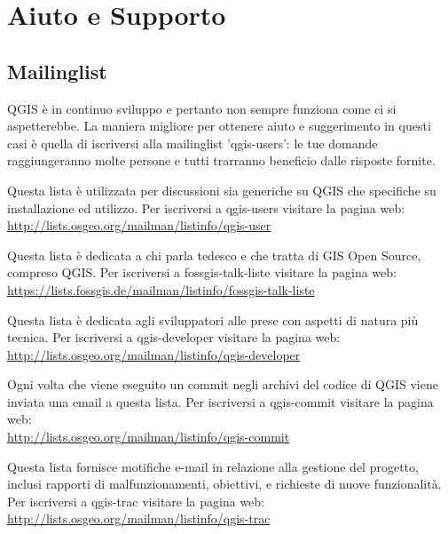 
\chapter{Aiuto e Supporto}\label{label_helpsupport}


\section{Mailinglist}
QGIS è in continuo sviluppo e pertanto non sempre funziona come ci si aspetterebbe.
La maniera migliore per ottenere aiuto e suggerimento in questi casi è quella 
di iscriversi alla mailinglist 'qgis-users': le tue domande raggiungeranno 
molte persone e tutti trarranno beneficio dalle risposte fornite.

Questa lista è utilizzata per discussioni sia generiche su QGIS che 
specifiche su installazione ed utilizzo. 
Per iscriversi a qgis-users visitare la pagina web: \\
\url{http://lists.osgeo.org/mailman/listinfo/qgis-user}

Questa lista è dedicata a chi parla tedesco e che tratta di GIS Open Source, 
compreso QGIS.
Per iscriversi a fossgis-talk-liste visitare la pagina web: \\
\url{https://lists.fossgis.de/mailman/listinfo/fossgis-talk-liste}

Questa lista è dedicata agli sviluppatori alle prese con aspetti di natura più tecnica.
Per iscriversi a qgis-developer visitare la pagina web: \\
\url{http://lists.osgeo.org/mailman/listinfo/qgis-developer}

Ogni volta che viene eseguito un commit negli archivi del codice di QGIS viene 
inviata una email a questa lista.
Per iscriversi a qgis-commit visitare la pagina web: \\
\url{http://lists.osgeo.org/mailman/listinfo/qgis-commit}

Questa lista fornisce motifiche e-mail in relazione alla gestione del progetto, inclusi 
rapporti di malfunzionamenti, obiettivi, e richieste di nuove funzionalità.
Per iscriversi a qgis-trac visitare la pagina web: \\
\url{http://lists.osgeo.org/mailman/listinfo/qgis-trac}

